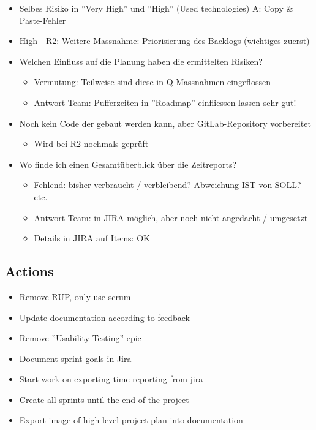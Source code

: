 \begin{itemize}
\begin{itemize}
    \end{itemize}
    \item Selbes Risiko in ''Very High'' und ''High'' (Used technologies) \textrightarrow A: Copy \& Paste-Fehler
    \item High - R2: Weitere Massnahme: Priorisierung des Backlogs (wichtiges zuerst)
    \item Welchen Einfluss auf die Planung haben die ermittelten Risiken?
    \begin{itemize}
        \item Vermutung: Teilweise sind diese in Q-Massnahmen eingeflossen
        \item Antwort Team: Pufferzeiten in ''Roadmap'' einfliessen lassen \textrightarrow sehr gut!
    \end{itemize}
    \item Noch kein Code der gebaut werden kann, aber GitLab-Repository vorbereitet
    \begin{itemize}
        \item Wird bei R2 nochmals geprüft
    \end{itemize}
    \item Wo finde ich einen Gesamtüberblick über die Zeitreports?
    \begin{itemize}
        \item Fehlend: bisher verbraucht / verbleibend? Abweichung IST von SOLL? etc.
        \item Antwort Team: in JIRA möglich, aber noch nicht angedacht / umgesetzt
        \item Details in JIRA auf Items: OK
    \end{itemize}
\end{itemize}

\subsection{Actions}

\begin{itemize}
    \item Remove RUP, only use scrum
    \item Update documentation according to feedback
    \item Remove ''Usability Testing'' epic
    \item Document sprint goals in Jira
    \item Start work on exporting time reporting from jira
    \item Create all sprints until the end of the project
    \item Export image of high level project plan into documentation
\end{itemize}


